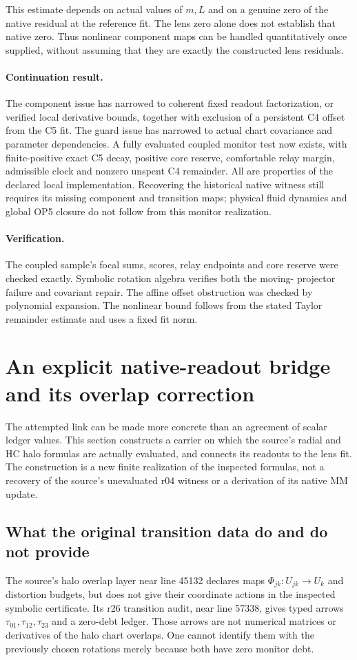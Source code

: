 \documentclass[11pt,a4paper]{article}
\begin{document}
This estimate depends on actual values of $m,L$ and on a genuine zero
of the native residual at the reference fit. The lens zero alone does
not establish that native zero. Thus nonlinear component maps can be
handled quantitatively once supplied, without assuming that they are
exactly the constructed lens residuals.

\paragraph{Continuation result.}
The component issue has narrowed to coherent fixed readout factorization,
or verified local derivative bounds, together with exclusion of a
persistent C4 offset from the C5 fit. The guard issue has narrowed to
actual chart covariance and parameter dependencies. A fully evaluated
coupled monitor test now exists, with finite-positive exact C5 decay,
positive core reserve, comfortable relay margin, admissible clock and
nonzero unspent C4 remainder. All are properties of the declared local
implementation. Recovering the historical native witness still requires
its missing component and transition maps; physical fluid dynamics and
global OP5 closure do not follow from this monitor realization.

\paragraph{Verification.}
The coupled sample's focal sums, scores, relay endpoints and core reserve
were checked exactly. Symbolic rotation algebra verifies both the moving-
projector failure and covariant repair. The affine offset obstruction was
checked by polynomial expansion. The nonlinear bound follows from the
stated Taylor remainder estimate and uses a fixed fit norm.

\section{An explicit native-readout bridge and its overlap correction}
\label{sec:explicit-native-readout-bridge}
The attempted link can be made more concrete than an agreement of scalar
ledger values. This section constructs a carrier on which the source's
radial and HC halo formulas are actually evaluated, and connects its
readouts to the lens fit. The construction is a new finite realization
of the inspected formulas, not a recovery of the source's unevaluated
r04 witness or a derivation of its native MM update.

\subsection{What the original transition data do and do not provide}
The source's halo overlap layer near line 45132 declares maps
$\Phi_{jk}:U_{jk}\to U_k$ and distortion budgets, but does not give
their coordinate actions in the inspected symbolic certificate. Its
r26 transition audit, near line 57338, gives typed arrows
$\tau_{01},\tau_{12},\tau_{23}$ and a zero-debt ledger. Those arrows
are not numerical matrices or derivatives of the halo chart overlaps.
One cannot identify them with the previously chosen rotations merely
because both have zero monitor debt.
\end{document}
